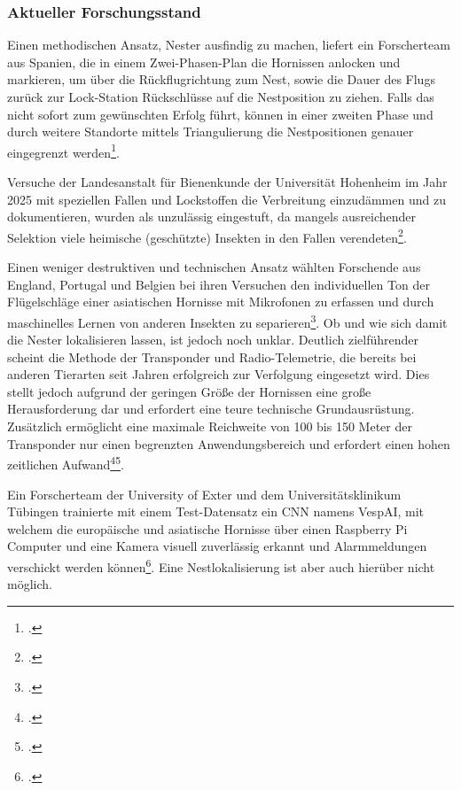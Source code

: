 \subsubsection{Aktueller Forschungsstand}\label{sec:Forschungsstand}
Einen methodischen Ansatz, Nester ausfindig zu machen, liefert ein Forscherteam aus Spanien, die in einem Zwei-Phasen-Plan die Hornissen anlocken und markieren, um über die Rückflugrichtung zum Nest, sowie die Dauer des Flugs zurück zur Lock-Station Rückschlüsse auf die Nestposition zu ziehen. Falls das nicht sofort zum gewünschten Erfolg führt, können in einer zweiten Phase und durch weitere Standorte mittels Triangulierung die Nestpositionen genauer eingegrenzt werden\footcite[S. dazu][o. S.]{method}.

Versuche der Landesanstalt für Bienenkunde der Universität Hohenheim im Jahr 2025 mit speziellen Fallen und Lockstoffen die Verbreitung einzudämmen und zu dokumentieren, wurden als unzulässig eingestuft, da mangels ausreichender Selektion viele heimische (geschützte) Insekten in den Fallen verendeten\footcite[S. dazu][o. S.]{unihohenheim}.

Einen weniger destruktiven und technischen Ansatz wählten Forschende aus England, Portugal und Belgien bei ihren Versuchen den individuellen Ton der Flügelschläge einer asiatischen Hornisse mit Mikrofonen zu erfassen und durch maschinelles Lernen von anderen Insekten zu separieren\footcite[S. dazu][o. S.]{flugsound}. Ob und wie sich damit die Nester lokalisieren lassen, ist jedoch noch unklar. Deutlich zielführender scheint die Methode der Transponder und Radio-Telemetrie, die bereits bei anderen Tierarten seit Jahren erfolgreich zur Verfolgung eingesetzt wird. Dies stellt jedoch aufgrund der geringen Größe der Hornissen eine große Herausforderung dar und erfordert eine teure technische Grundausrüstung. Zusätzlich ermöglicht eine maximale Reichweite von 100 bis 150 Meter der Transponder nur einen begrenzten Anwendungsbereich und erfordert einen hohen zeitlichen Aufwand\footcite[S. dazu][o. S.]{radio-telemetry1}\footcite[S. dazu][o. S.]{radio-telemetry2}. 

Ein Forscherteam der University of Exter und dem Universitätsklinikum Tübingen trainierte mit einem Test-Datensatz ein \ac{CNN} namens VespAI, mit welchem die europäische und asiatische Hornisse über einen Raspberry Pi Computer und eine Kamera visuell zuverlässig erkannt und Alarmmeldungen verschickt werden können\footcite[S. dazu][o. S.]{vespai}. Eine Nestlokalisierung ist aber auch hierüber nicht möglich.

